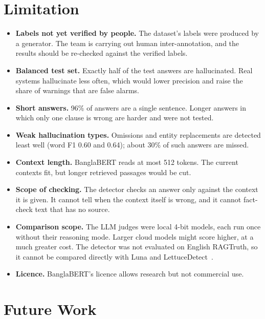 \section{Limitation}

\begin{itemize}
  \item \textbf{Labels not yet verified by people.} The dataset's labels were
  produced by a generator. The team is carrying out human inter-annotation, and
  the results should be re-checked against the verified labels.
  \item \textbf{Balanced test set.} Exactly half of the test answers are
  hallucinated. Real systems hallucinate less often, which would lower
  precision and raise the share of warnings that are false alarms.
  \item \textbf{Short answers.} 96\% of answers are a single sentence. Longer
  answers in which only one clause is wrong are harder and were not tested.
  \item \textbf{Weak hallucination types.} Omissions and entity replacements
  are detected least well (word F1 0.60 and 0.64); about 30\% of such
  answers are missed.
  \item \textbf{Context length.} BanglaBERT reads at most 512 tokens. The
  current contexts fit, but longer retrieved passages would be cut.
  \item \textbf{Scope of checking.} The detector checks an answer only against
  the context it is given. It cannot tell when the context itself is wrong, and
  it cannot fact-check text that has no source.
  \item \textbf{Comparison scope.} The LLM judges were local 4-bit models, each
  run once without their reasoning mode. Larger cloud models might score
  higher, at a much greater cost. The detector was not evaluated on English
  RAGTruth, so it cannot be compared directly with Luna and
  LettuceDetect~\cite{luna,lettucedetect}.
  \item \textbf{Licence.} BanglaBERT's licence allows research but not
  commercial use.
\end{itemize}

\section{Future Work}

